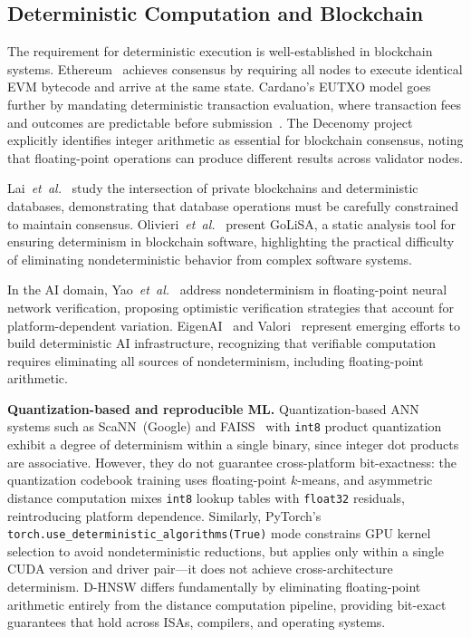 \documentclass[10pt,journal]{IEEEtran}
\newcommand{\dhnsw}{\textsc{D-HNSW}}
\newcommand{\etal}{\textit{et~al.}}
\begin{document}
\subsection{Deterministic Computation and Blockchain}

The requirement for deterministic execution is well-established in blockchain systems. Ethereum~\cite{buterin2014ethereum} achieves consensus by requiring all nodes to execute identical EVM bytecode and arrive at the same state. Cardano's EUTXO model goes further by mandating deterministic transaction evaluation, where transaction fees and outcomes are predictable before submission~\cite{cardano2024fees}. The Decenomy project~\cite{decenomy2024integer} explicitly identifies integer arithmetic as essential for blockchain consensus, noting that floating-point operations can produce different results across validator nodes.

Lai~\etal{}~\cite{lai2022blockchain} study the intersection of private blockchains and deterministic databases, demonstrating that database operations must be carefully constrained to maintain consensus. Olivieri~\etal{}~\cite{olivieri2022golisa} present GoLiSA, a static analysis tool for ensuring determinism in blockchain software, highlighting the practical difficulty of eliminating nondeterministic behavior from complex software systems.

In the AI domain, Yao~\etal{}~\cite{yao2025nao} address nondeterminism in floating-point neural network verification, proposing optimistic verification strategies that account for platform-dependent variation. EigenAI~\cite{alves2026eigenai} and Valori~\cite{gudur2025valori} represent emerging efforts to build deterministic AI infrastructure, recognizing that verifiable computation requires eliminating all sources of nondeterminism, including floating-point arithmetic.

\textbf{Quantization-based and reproducible ML.} Quantization-based ANN systems such as ScaNN~(Google) and FAISS~\cite{douze2024faiss} with \texttt{int8} product quantization exhibit a degree of determinism within a single binary, since integer dot products are associative. However, they do not guarantee cross-platform bit-exactness: the quantization codebook training uses floating-point $k$-means, and asymmetric distance computation mixes \texttt{int8} lookup tables with \texttt{float32} residuals, reintroducing platform dependence. Similarly, PyTorch's \texttt{torch.use\_deterministic\_algorithms(True)} mode constrains GPU kernel selection to avoid nondeterministic reductions, but applies only within a single CUDA version and driver pair---it does not achieve cross-architecture determinism. \dhnsw{} differs fundamentally by eliminating floating-point arithmetic entirely from the distance computation pipeline, providing bit-exact guarantees that hold across ISAs, compilers, and operating systems.
\end{document}
